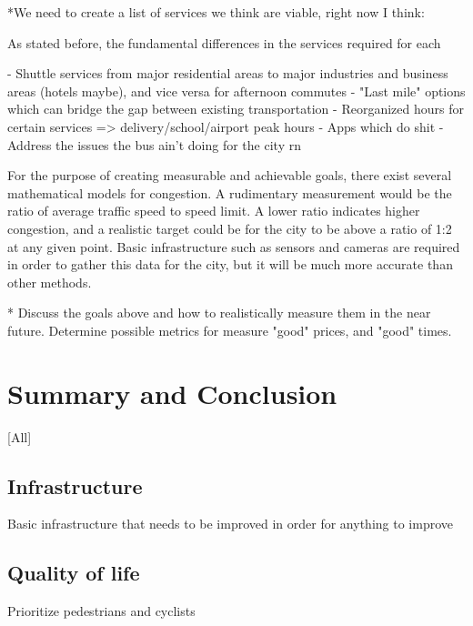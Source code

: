 \documentclass[12pt]{article}                       %
\begin{document}
*We need to create a list of services we think are viable, right now I think:

As stated before, the fundamental differences in the services required for each 

- Shuttle services from major residential areas to major industries and business areas (hotels maybe), and vice versa for afternoon commutes
- "Last mile" options which can bridge the gap between existing transportation
- Reorganized hours for certain services
	=> delivery/school/airport peak hours
- Apps which do shit
- Address the issues the bus ain't doing for the city rn

For the purpose of creating measurable and achievable goals, there exist several mathematical models for congestion. A rudimentary measurement would be the ratio of average traffic speed to speed limit. A lower ratio indicates higher congestion, and a realistic target could be for the city to be above a ratio of 1:2 at any given point. Basic infrastructure such as sensors and cameras are required in order to gather this data for the city, but it will be much more accurate than other methods. 

* Discuss the goals above and how to realistically measure them in the near future. Determine possible metrics for measure "good" prices, and "good" times.  

\section{Summary and Conclusion}[All]
\subsection{Infrastructure}
Basic infrastructure that needs to be improved in order for anything to improve

\subsection{Quality of life}
Prioritize pedestrians and cyclists




\newpage


\end{document}
